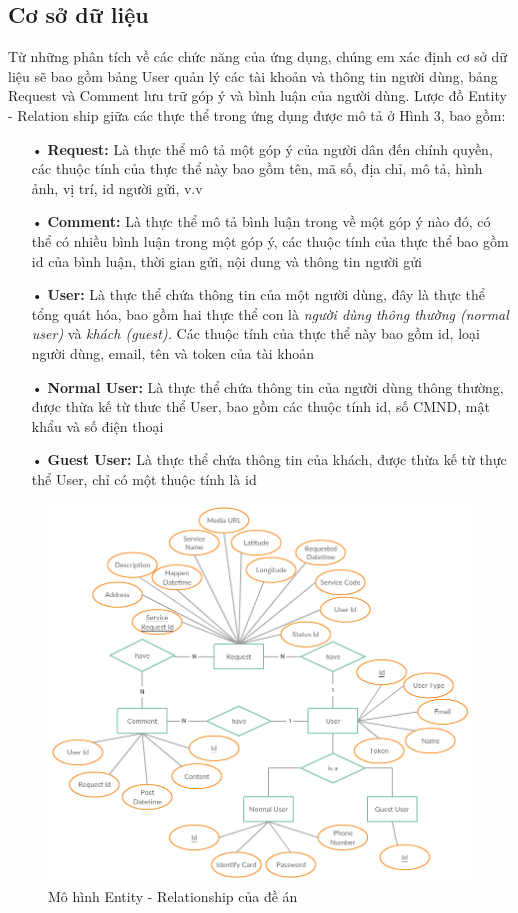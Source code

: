 \documentclass[a4paper]{article}
\begin{document}
\subsection{Cơ sở dữ liệu}
Từ những phân tích về các chức năng của ứng dụng, chúng em xác định cơ sở dữ liệu sẽ bao gồm bảng User quản lý các tài khoản và thông tin người dùng, bảng Request và Comment lưu trữ góp ý và bình luận của người dùng. Lược đồ Entity - Relation ship giữa các thực thể trong ứng dụng được mô tả ở Hình 3, bao gồm:
\begin{itemize}
\item[•]\textbf{Request: }Là thực thể mô tả một góp ý của người dân đến chính quyền, các thuộc tính của thực thể này bao gồm tên, mã số, địa chỉ, mô tả, hình ảnh, vị trí, id người gửi, v.v
\item[•]\textbf{Comment: }Là thực thể mô tả bình luận trong về một góp ý nào đó, có thể có nhiều bình luận trong một góp ý, các thuộc tính của thực thể bao gồm id của bình luận, thời gian gửi, nội dung và thông tin người gửi
\item[•]\textbf{User: }Là thực thể chứa thông tin của một người dùng, đây là thực thể tổng quát hóa, bao gồm hai thực thể con là \textit{người dùng thông thường (normal user)} và \textit{khách (guest).} Các thuộc tính của thực thể này bao gồm id, loại người dùng, email, tên và token của tài khoản
\item[•]\textbf{Normal User: }Là thực thể chứa thông tin của người dùng thông thường, được thừa kế từ thưc thể User, bao gồm các thuộc tính id, số CMND, mật khẩu và số điện thoại
\item[•]\textbf{Guest User: }Là thực thể chứa thông tin của khách, được thừa kế từ thực thể User, chỉ có một thuộc tính là id
\end{itemize}
\begin{center}
    \begin{figure}[h]
    \begin{center}
     \includegraphics[scale=.65]{entity-diagram.png}
    \end{center}
    \caption{Mô hình Entity - Relationship của đề án}
    \label{refhinh1}
    \end{figure}
\end{center}
\end{document}
